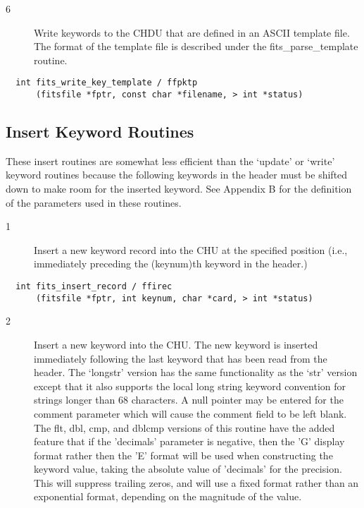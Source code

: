 \documentclass[11pt]{book}
\begin{document}
\begin{description}
\item[6 ]Write keywords to the CHDU that are defined in an ASCII template file.
   The format of the template file is described under the fits\_parse\_template
  routine. \label{ffpktp}
\end{description}

\begin{verbatim}
  int fits_write_key_template / ffpktp
      (fitsfile *fptr, const char *filename, > int *status)
\end{verbatim}

\subsection{Insert Keyword Routines}

These insert routines are somewhat less efficient than the `update' or
`write' keyword routines  because the following keywords in the header
must be shifted down to make room for the inserted keyword.  See
Appendix B for the definition of the parameters used in these
routines.


\begin{description}
\item[1 ] Insert a new keyword record into the CHU at the specified position
    (i.e., immediately preceding the (keynum)th keyword in the header.)
  \label{ffirec}
\end{description}

\begin{verbatim}
  int fits_insert_record / ffirec
      (fitsfile *fptr, int keynum, char *card, > int *status)
\end{verbatim}

\begin{description}
\item[2 ] Insert a new keyword into the CHU.  The new keyword is inserted
    immediately following the last keyword that has been read from the
    header.  The `longstr' version has the same functionality as the
    `str' version except that it also supports the local long string
    keyword convention for strings longer than 68 characters.  A null
    pointer may be entered for the comment parameter which will cause
    the comment field to be left blank.  The flt, dbl, cmp, and dblcmp
    versions of this routine have the added
     feature that if the 'decimals' parameter is negative, then the 'G'
     display format rather then the 'E' format will be used when
     constructing the keyword value, taking the absolute value of
     'decimals' for the precision.  This will suppress trailing zeros,
     and will use a fixed format rather than an exponential format,
    depending on the magnitude of the value. \label{ffikyx}
\end{description}
\end{document}
